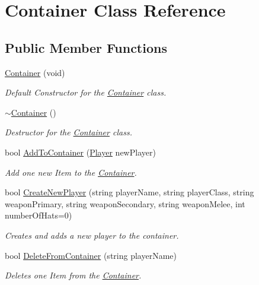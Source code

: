 \hypertarget{class_container}{}\section{Container Class Reference}
\label{class_container}
\subsection*{Public Member Functions}
\begin{DoxyCompactItemize}
\item 
\hyperlink{class_container_a5231ead51bcdd1a9b1f497414e76b6f4}{Container} (void)
\begin{DoxyCompactList}\small\item\em Default Constructor for the \hyperlink{class_container}{Container} class. \end{DoxyCompactList}\item 
\hyperlink{class_container_ae9f5d07bfc3defda274aa06091c19f56}{$\sim$\+Container} ()
\begin{DoxyCompactList}\small\item\em Destructor for the \hyperlink{class_container}{Container} class. \end{DoxyCompactList}\item 
bool \hyperlink{class_container_adcb2699db821af086db2fbce6a9470e1}{Add\+To\+Container} (\hyperlink{class_player}{Player} new\+Player)
\begin{DoxyCompactList}\small\item\em Add one new Item to the \hyperlink{class_container}{Container}. \end{DoxyCompactList}\item 
bool \hyperlink{class_container_ae3929ee46a7b14b864a52cbc6f3f4e44}{Create\+New\+Player} (string player\+Name, string player\+Class, string weapon\+Primary, string weapon\+Secondary, string weapon\+Melee, int number\+Of\+Hats=0)
\begin{DoxyCompactList}\small\item\em Creates and adds a new player to the container. \end{DoxyCompactList}\item 
bool \hyperlink{class_container_a83bdee8dd09ef673375f337de4763481}{Delete\+From\+Container} (string player\+Name)
\begin{DoxyCompactList}\small\item\em Deletes one Item from the \hyperlink{class_container}{Container}. \end{DoxyCompactList}\item 

\end{DoxyCompactItemize}
